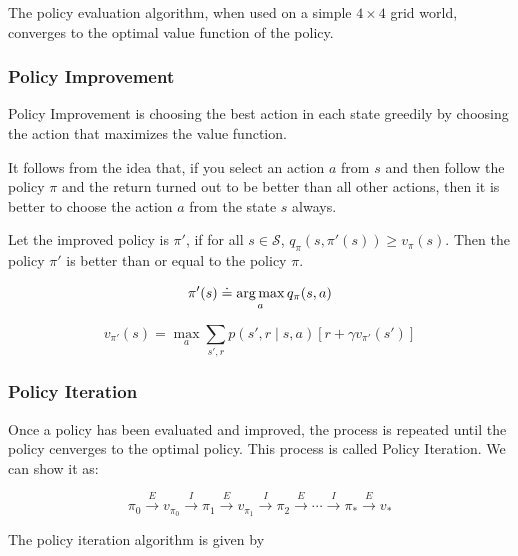 The policy evaluation algorithm, when used on a simple $4\times 4$ grid world, converges to the optimal value function of the policy.

\subsubsection{Policy Improvement}

Policy Improvement is choosing the best action in each state greedily by choosing the action that maximizes the value function.

It follows from the idea that, if you select an action $a$ from $s$ and then follow the policy $\pi$ and the return turned out to be better than all other actions, then it is better to choose the action $a$ from the state $s$ always.

Let the improved policy is $\pi'$, if for all $s\in \mathcal{S}$, $q_\pi(s, \pi'(s)) \geq v_\pi(s)$. Then the policy $\pi'$ is better than or equal to the policy $\pi$.

\begin{equation}
    \pi'(s) \doteq \operatorname*{arg\,max}_a q_\pi(s, a) 
\end{equation}

\begin{equation}
    v_{\pi'}(s) = \max_a \sum_{s',r}p(s',r\mid s,a)\left[r + \gamma v_{\pi'}(s')\right]
\end{equation}

\subsubsection{Policy Iteration}

Once a policy has been evaluated and improved, the process is repeated until the policy cenverges to the optimal policy. This process is called Policy Iteration. We can show it as:

\begin{equation}
    \pi_0 \xrightarrow{E} v_{\pi_0} \xrightarrow{I} \pi_1 \xrightarrow{E} v_{\pi_1} \xrightarrow{I} \pi_2 \xrightarrow{E} \cdots \xrightarrow{I} \pi_\ast \xrightarrow{E} v_\ast
\end{equation}

The policy iteration algorithm is given by

